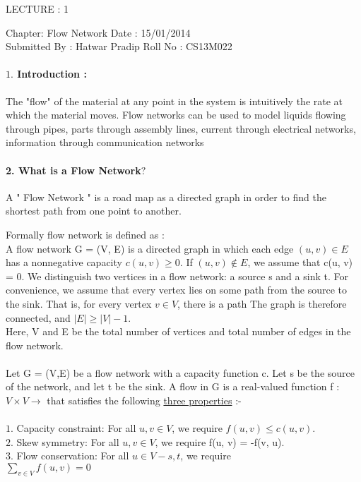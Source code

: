 \documentclass[a4paper,12pt]{article}
\begin{document}
\begin{center}
LECTURE : 1  \\
   

\end{center}
Chapter: Flow Network \hspace*{55mm}Date : 15/01/2014 \\Submitted By : Hatwar Pradip    
  \hspace*{43mm}Roll No : CS13M022



		\paragraph*{ $1.$ Introduction :  \\}
		{
			The "flow" of the material at any point in the system is intuitively the rate at which the material moves. Flow networks can be used to model liquids flowing through pipes, parts through assembly lines, current through electrical networks, information through communication networks 
		}

		\paragraph*{2. What is a Flow Network$?$ \\ }{
		
		 A " Flow Network " is a road map as a directed graph in order to find the shortest path from one point to another. 
		 
		 Formally flow network is defined as : \\   
		A flow network G = (V, E) is a directed graph in which each edge $(u,v) \in E$ has a nonnegative capacity $c(u, v) \geq 0$. If $(u,v)\notin E$, we assume that c(u, v) = 0. We distinguish two vertices in a flow network: a source s and a sink t. For convenience, we assume that every vertex lies on some path from the source to the sink. That is, for every vertex $v \in V$, there is a path  The graph is therefore connected, and $ |E| \geq |V| - 1 $.   \\   
		Here, V and E be the total number of vertices and total number of edges in the flow network. 
		}


	\paragraph*{}
	{
	Let G = (V,E) be a flow network with a capacity function c. Let s be the source of the network, and let t be the sink. A flow in G is a real-valued function f : $V \times V \rightarrow $ that satisfies the following \underline{three properties\textit{}} :-  \\ \\
	$1.$ Capacity constraint: For all $ u, v \in V $, we require $f(u, v) \leq c(u, v)$.  \\ 
	$2.$  Skew symmetry: For all $u, v \in V$, we require f(u, v) = -f(v, u).  \\
	$3.$ Flow conservation: For all $u \in V - {s, t}$, we require   \\ 
	$\sum_{v \in V}^{} f(u, v) = 0 $ } 
\end{document}

